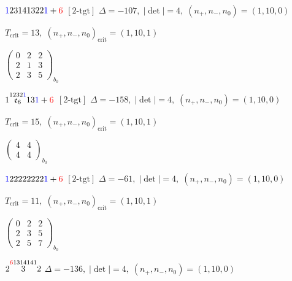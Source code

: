 \documentclass[10pt]{article}
\begin{document}
\smallskip

$\textcolor{blue}{1}23141322\textcolor{blue}{1}+\textcolor{red}{6}$ $\scriptstyle [2\text{-tgt}]$ \quad $\Delta=-107,\; |\det|=4,\; (n_+,n_-,n_0)=(1,10,0)$

\hspace{1em}$T_{\text{crit}}=13,\; (n_+,n_-,n_0)_{\text{crit}}=(1,10,1)$

\hspace{2em}$\left(\begin{smallmatrix}0 & 2 & 2 \\ 2 & 1 & 3 \\ 2 & 3 & 5\end{smallmatrix}\right)_{\!b_0}$

\smallskip

$1\overset{1232\textcolor{blue}{1}}{\mathfrak{e}_6}13\textcolor{blue}{1}+\textcolor{red}{6}$ $\scriptstyle [2\text{-tgt}]$ \quad $\Delta=-158,\; |\det|=4,\; (n_+,n_-,n_0)=(1,10,0)$

\hspace{1em}$T_{\text{crit}}=15,\; (n_+,n_-,n_0)_{\text{crit}}=(1,10,1)$

\hspace{2em}$\left(\begin{smallmatrix}4 & 4 \\ 4 & 4\end{smallmatrix}\right)_{\!b_0}$

\smallskip

$\textcolor{blue}{1}22222222\textcolor{blue}{1}+\textcolor{red}{6}$ $\scriptstyle [2\text{-tgt}]$ \quad $\Delta=-61,\; |\det|=4,\; (n_+,n_-,n_0)=(1,10,0)$

\hspace{1em}$T_{\text{crit}}=11,\; (n_+,n_-,n_0)_{\text{crit}}=(1,10,1)$

\hspace{2em}$\left(\begin{smallmatrix}0 & 2 & 2 \\ 2 & 3 & 5 \\ 2 & 5 & 7\end{smallmatrix}\right)_{\!b_0}$

\smallskip

$2\overset{\textcolor{red}{6}1314141}{3}2$ \quad $\Delta=-136,\; |\det|=4,\; (n_+,n_-,n_0)=(1,10,0)$
\end{document}
